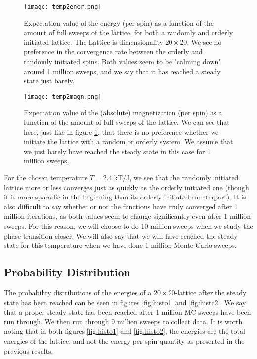 \documentclass[reprint,english,notitlepage]{revtex4-1}  %
\begin{document}
\begin{figure}[h!]
    \centering
    \texttt{[image: temp2ener.png]}
    \caption{Expectation value of the energy (per spin) as a function of the amount of full sweeps of the lattice, for both a randomly and orderly initiated lattice. The Lattice is dimensionality $20\times20$. We see no preference in the convergence rate between the orderly and randomly initiated spins. Both values seem to be "calming down" around 1 million sweeps, and we say that it has reached a steady state just barely.}
    \label{fig:ordertemp2ener}
\end{figure}

\begin{figure}[h!]
    \centering
    \texttt{[image: temp2magn.png]}
    \caption{Expectation value of the (absolute) magnetization (per spin) as a function of the amount of full sweeps of the lattice. We can see that here, just like in figure \ref{fig:ordertemp2ener}, that there is no preference whether we initiate the lattice with a random or orderly system. We assume that we just barely have reached the steady state in this case for 1 million sweeps.}
    \label{fig:ordertemp2magn}
\end{figure}

For the chosen temperature $T = 2.4\;\text{kT/J}$, we see that the randomly initiated lattice more or less converges just as quickly as the orderly initiated one (though it is more sporadic in the beginning than its orderly initiated counterpart). It is also difficult to say whether or not the functions have truly converged after 1 million iterations, as both values seem to change significantly even after 1 million sweeps. For this reason, we will choose to do 10 million sweeps when we study the phase transition closer. We will also say that we will have reached the steady state for this temperature when we have done 1 million Monte Carlo sweeps.

\subsection{Probability Distribution}

The probability distributions of the energies of a $20\times20$-lattice after the steady state has been reached can be seen in figures \ref{fig:histo1} and \ref{fig:histo2}. We say that a proper steady state has been reached after 1 million MC sweeps have been run through. We then run through 9 million sweeps to collect data. It is worth noting that in both figures \ref{fig:histo1} and \ref{fig:histo2}, the energies are the total energies of the lattice, and not the energy-per-spin quantity as presented in the previous results.
\end{document}
